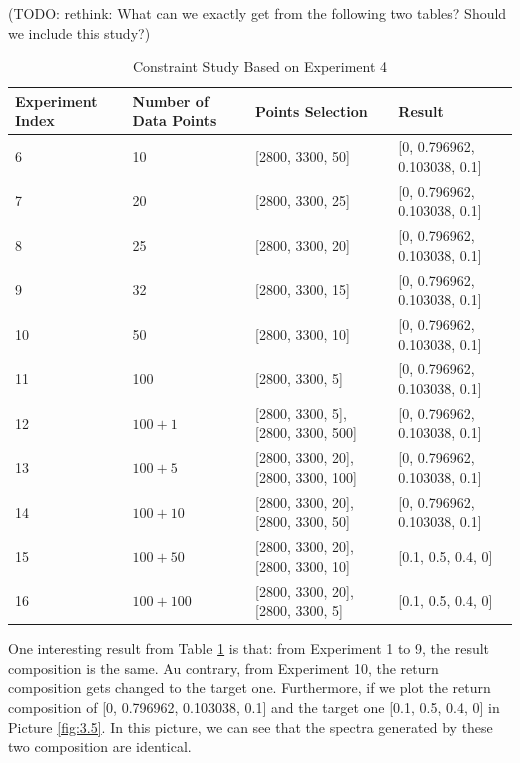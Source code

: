 (TODO: rethink: What can we exactly get from the following two tables? Should we include this study?)

\begin{table} \small \label{tab:3.4}
\begin{center}
\begin{tabular}{| l | l | p{3cm} | l |} \hline
	Experiment Index & Number of Data Points & Points Selection & Result \\ \hline
	6 & 10 & [2800, 3300, 50] & [0, 0.796962, 0.103038, 0.1] \\ \hline
	7 & 20 & [2800, 3300, 25] & [0, 0.796962, 0.103038, 0.1] \\ \hline
	8 & 25 & [2800, 3300, 20] & [0, 0.796962, 0.103038, 0.1] \\ \hline
	9 & 32 & [2800, 3300, 15] & [0, 0.796962, 0.103038, 0.1] \\ \hline
	10 & 50 & [2800, 3300, 10] & [0, 0.796962, 0.103038, 0.1] \\ \hline
	11 & 100 & [2800, 3300, 5] & [0, 0.796962, 0.103038, 0.1] \\ \hline
	12 & $100 + 1$ & [2800, 3300, 5], [2800, 3300, 500] & [0, 0.796962, 0.103038, 0.1] \\ \hline
	13 & $100 + 5$ & [2800, 3300, 20], [2800, 3300, 100] & [0, 0.796962, 0.103038, 0.1] \\ \hline
	14 & $100 + 10$ & [2800, 3300, 20], [2800, 3300, 50] & [0, 0.796962, 0.103038, 0.1] \\ \hline
	15 & $100 + 50$ & [2800, 3300, 20], [2800, 3300, 10] & [0.1, 0.5, 0.4, 0] \\ \hline
	16 & $100 + 100$ & [2800, 3300, 20], [2800, 3300, 5] & [0.1, 0.5, 0.4, 0] \\ 
	\hline
\end{tabular} 
\end{center}
\caption{Constraint Study Based on Experiment 4}
\end{table}

One interesting result from Table \ref{tab:3.4} is that: from Experiment 1 to 9, the result composition is the same. Au contrary, from Experiment 10, the return composition gets changed to the target one. Furthermore, if we plot the return composition of [0, 0.796962, 0.103038, 0.1] and the target one [0.1, 0.5, 0.4, 0] in  Picture \ref{fig:3.5}. In this picture, we can see that the spectra generated by these two composition are identical.

